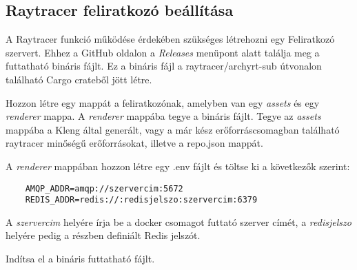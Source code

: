 \subsection{Raytracer feliratkozó beállítása}


A Raytracer funkció működése érdekében szükséges létrehozni egy Feliratkozó szervert.
Ehhez a GitHub oldalon a \emph{Releases} menüpont alatt találja meg a futtatható bináris fájlt.
Ez a bináris fájl a raytracer/archyrt-sub útvonalon található Cargo crateből jött létre.



Hozzon létre egy mappát a feliratkozónak, amelyben van egy \emph{assets} és egy \emph{renderer} mappa. A \emph{renderer} mappába tegye a bináris fájlt. Tegye az \emph{assets} mappába a Kleng által generált, vagy a már kész erőforráscsomagban található raytracer minőségű erőforrásokat, illetve a repo.json mappát. 

A \emph{renderer} mappában hozzon létre egy .env fájlt és töltse ki a következők szerint:
\begin{lstlisting}
    AMQP_ADDR=amqp://szervercim:5672
    REDIS_ADDR=redis://:redisjelszo:szervercim:6379
\end{lstlisting}

A \emph{szervercim} helyére írja be a docker csomagot futtató szerver címét, a \emph{redisjelszo} helyére pedig a \textbf{} részben definiált Redis jelszót.

Indítsa el a bináris futtatható fájlt.